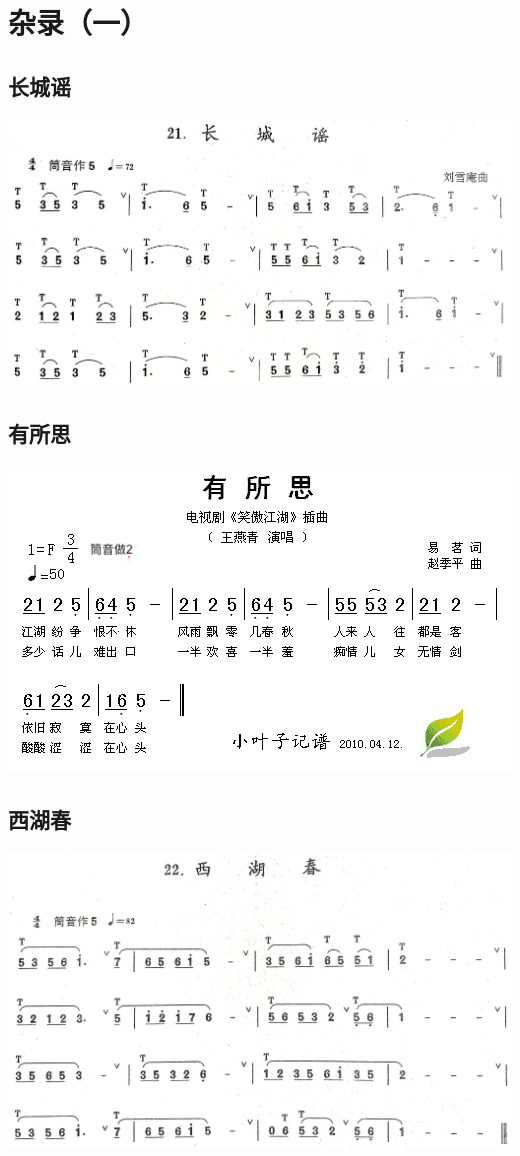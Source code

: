 \documentclass[cn,pad,twocol]{elegantbook}
\begin{document}
\chapter{杂录（一）}
\section{长城谣}    \includegraphics[width=\textwidth]{dongxiao/20200711-长城谣.jpg}
\section{有所思}    \includegraphics[width=\textwidth]{dongxiao/20200710-有所思}
\section{西湖春}    \includegraphics[width=\textwidth]{dongxiao/20200711-西湖春.jpg}
\end{document}

